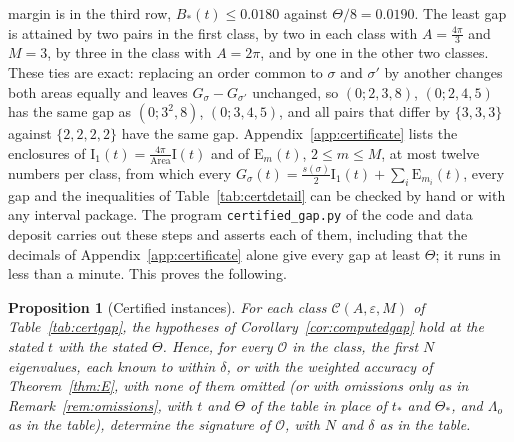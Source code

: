 \documentclass[pdflatex,sn-mathphys-num]{sn-jnl}
\theoremstyle{thmstyleone}%
\newtheorem{proposition}[theorem]{Proposition}%
\theoremstyle{thmstylethree}%
\newcommand{\Orb}{\mathcal{O}}
\newcommand{\Cl}{\mathcal{C}}
\newcommand{\Area}{\operatorname{Area}}
\begin{document}
margin is in the third row, $B_*(t)\le0.0180$ against $\Theta/8=0.0190$. The least gap is attained by two pairs in the first class, by two in each class with $A=\frac{4\pi}3$ and $M=3$, by three in the class with $A=2\pi$, and by one in the other two classes. These ties are exact: replacing an order common to $\sigma$ and $\sigma'$ by another changes both areas equally and leaves $G_\sigma-G_{\sigma'}$ unchanged, so $(0;2,3,8)$, $(0;2,4,5)$ has the same gap as $(0;3^2,8)$, $(0;3,4,5)$, and all pairs that differ by $\{3,3,3\}$ against $\{2,2,2,2\}$ have the same gap. Appendix~\ref{app:certificate} lists the enclosures of $\mathrm I_1(t)=\frac{4\pi}{\Area}\mathrm I(t)$ and of $\mathrm E_m(t)$, $2\le m\le M$, at most twelve numbers per class, from which every $G_\sigma(t)=\frac{s(\sigma)}2\mathrm I_1(t)+\sum_i\mathrm E_{m_i}(t)$, every gap and the inequalities of Table~\ref{tab:certdetail} can be checked by hand or with any interval package. The program \texttt{certified\_gap.py} of the code and data deposit carries out these steps and asserts each of them, including that the decimals of Appendix~\ref{app:certificate} alone give every gap at least $\Theta$; it runs in less than a minute. This proves the following.

\begin{proposition}[Certified instances]\label{prop:certgap}
For each class $\Cl(A,\varepsilon,M)$ of Table~\ref{tab:certgap}, the hypotheses of Corollary~\ref{cor:computedgap} hold at the stated $t$ with the stated $\Theta$. Hence, for every $\Orb$ in the class, the first $N$ eigenvalues, each known to within $\delta$, or with the weighted accuracy of Theorem~\ref{thm:E}, with none of them omitted (or with omissions only as in Remark~\ref{rem:omissions}, with $t$ and $\Theta$ of the table in place of $t_*$ and $\Theta_*$, and $\Lambda_o$ as in the table), determine the signature of $\Orb$, with $N$ and $\delta$ as in the table.
\end{proposition}
\end{document}
